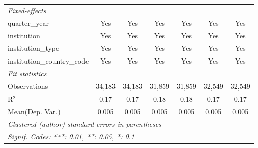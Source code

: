 \begin{tabular}{lcccccc}
   \midrule
   \emph{Fixed-effects}\\
   quarter\_year                      & Yes     & Yes            & Yes     & Yes       & Yes     & Yes\\  
   institution                        & Yes     & Yes            & Yes     & Yes       & Yes     & Yes\\  
   institution\_type                  & Yes     & Yes            & Yes     & Yes       & Yes     & Yes\\  
   institution\_country\_code         & Yes     & Yes            & Yes     & Yes       & Yes     & Yes\\  
   \midrule
   \emph{Fit statistics}\\
   Observations                       & 34,183  & 34,183         & 31,859  & 31,859    & 32,549  & 32,549\\  
   R$^2$                              & 0.17    & 0.17           & 0.18    & 0.18      & 0.17    & 0.17\\  
Mean(Dep. Var.) & 0.005 & 0.005 & 0.005 & 0.005 & 0.005 & 0.005 \\
   \midrule \midrule
   \multicolumn{7}{l}{\emph{Clustered (author) standard-errors in parentheses}}\\
   \multicolumn{7}{l}{\emph{Signif. Codes: ***: 0.01, **: 0.05, *: 0.1}}\\
\end{tabular}
\par\endgroup

